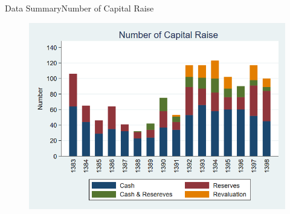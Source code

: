 \documentclass{beamer}
\begin{document}
	\begin{frame}{Data Summary}{Number of Capital Raise}
		\begin{figure}
			\centering
			\includegraphics[width=0.7\linewidth]{Number2.png}
			\label{fig:number2}
		\end{figure}
		
	\end{frame}
	
	
\end{document}
